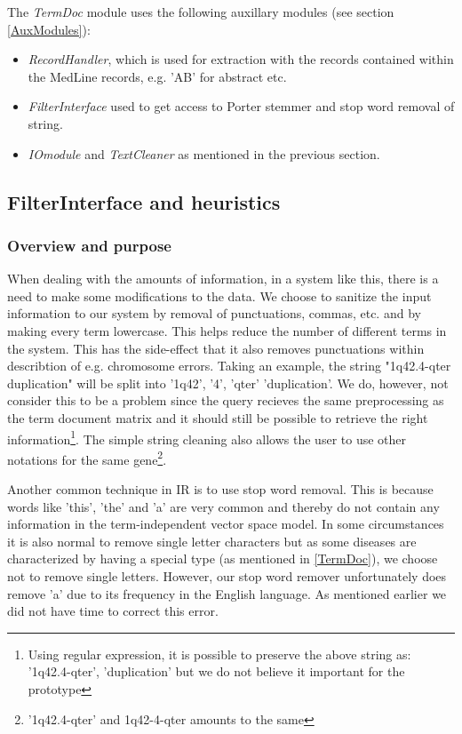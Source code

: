 The \textit{TermDoc} module uses the following auxillary modules (see
section \ref{AuxModules}):

\begin{itemize}
  \item \textit{RecordHandler}, which is used for extraction with the
    records contained within the MedLine records, e.g. 'AB' for
    abstract etc.
  \item \textit{FilterInterface} used to get access to Porter stemmer and stop
word removal of string.
  \item \textit{IOmodule} and \textit{TextCleaner} as mentioned in the
    previous section.
\end{itemize}


\subsection{FilterInterface and heuristics}

\subsubsection{Overview and purpose}
When dealing with the amounts of information, in a system like this,
there is a need to make some modifications to the data. We choose to
sanitize the input information to our system by removal of
punctuations, commas, etc. and by making every term lowercase. This
helps reduce the number of different terms in the system. This has the
side-effect that it also removes punctuations within describtion of
e.g. chromosome errors. Taking an example, the string "1q42.4-qter
duplication" will be split into '1q42', '4', 'qter' 'duplication'. We
do, however, not consider this to be a problem since the query
recieves the same preprocessing as the term document matrix and it
should still be possible to retrieve the right
information\footnote{Using regular expression, it is possible to
  preserve the above string as: '1q42.4-qter', 'duplication' but we do
  not believe it important for the prototype}. The simple string
cleaning also allows the user to use other notations for the same
gene\footnote{'1q42.4-qter' and 1q42-4-qter amounts to the same}.

Another common technique in IR is to use stop word removal. This is
because words like 'this', 'the' and 'a' are very common and thereby
do not contain any information in the term-independent vector space
model. In some circumstances it is also normal to remove single letter
characters but as some diseases are characterized by having a special
type (as mentioned in \ref{TermDoc}), we choose not to remove single
letters. However, our stop word remover unfortunately does remove 'a'
due to its frequency in the English language. As mentioned earlier we
did not have time to correct this error.

